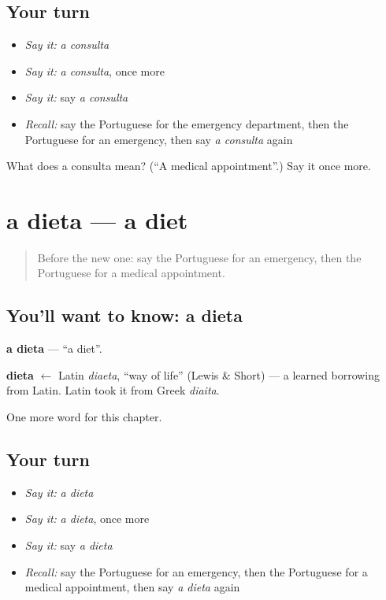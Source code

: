 \subsection*{Your turn}
\begin{itemize}
\raggedright
  \item \emph{Say it:} \emph{a consulta}
  \item \emph{Say it:} \emph{a consulta}, once more
  \item \emph{Say it:} say \emph{a consulta}
  \item \emph{Recall:} say the Portuguese for the emergency department, then the Portuguese for an emergency, then say \emph{a consulta} again
\end{itemize}

\begin{tcolorbox}[breakable,colback=teal!4,colframe=teal!35!black,title={Before you move on}]
What does a consulta mean? (\textquotedblleft{}A medical appointment\textquotedblright{}.) Say it once more.
\end{tcolorbox}
\section[a dieta]{a dieta — a diet}

\label{lesson:PT-C240-dieta}



\begin{quote}
Before the new one: say the Portuguese for an emergency, then the Portuguese for a medical appointment.
\end{quote}

\subsection*{You'll want to know: a dieta}
\textbf{a dieta} — \textquotedblleft{}a diet\textquotedblright{}.

\begin{cousinweb}
\textbf{dieta} $\leftarrow$ Latin \emph{diaeta}, \textquotedblleft{}way of life\textquotedblright{} (Lewis \& Short) — a learned borrowing from Latin. Latin took it from Greek \emph{diaita}.
\end{cousinweb}

\begin{grammarlens}[title={What you've built}]
One more word for this chapter.
\end{grammarlens}

\subsection*{Your turn}
\begin{itemize}
\raggedright
  \item \emph{Say it:} \emph{a dieta}
  \item \emph{Say it:} \emph{a dieta}, once more
  \item \emph{Say it:} say \emph{a dieta}
  \item \emph{Recall:} say the Portuguese for an emergency, then the Portuguese for a medical appointment, then say \emph{a dieta} again
\end{itemize}

